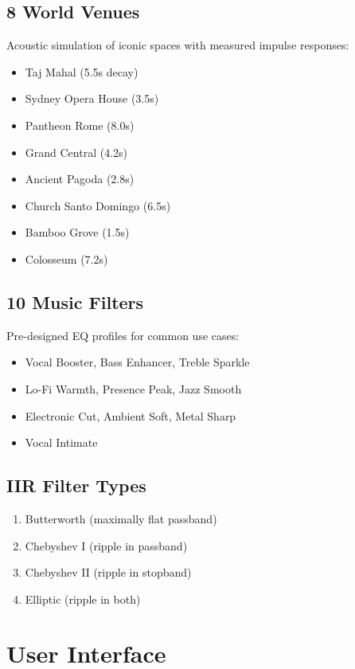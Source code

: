 \documentclass[twocolumn]{article}
\begin{document}
\subsection{8 World Venues}
Acoustic simulation of iconic spaces with measured impulse responses:
\begin{itemize}
    \item Taj Mahal (5.5s decay)
    \item Sydney Opera House (3.5s)
    \item Pantheon Rome (8.0s)
    \item Grand Central (4.2s)
    \item Ancient Pagoda (2.8s)
    \item Church Santo Domingo (6.5s)
    \item Bamboo Grove (1.5s)
    \item Colosseum (7.2s)
\end{itemize}

\subsection{10 Music Filters}
Pre-designed EQ profiles for common use cases:
\begin{itemize}
    \item Vocal Booster, Bass Enhancer, Treble Sparkle
    \item Lo-Fi Warmth, Presence Peak, Jazz Smooth
    \item Electronic Cut, Ambient Soft, Metal Sharp
    \item Vocal Intimate
\end{itemize}

\subsection{IIR Filter Types}
\begin{enumerate}
    \item Butterworth (maximally flat passband)
    \item Chebyshev I (ripple in passband)
    \item Chebyshev II (ripple in stopband)
    \item Elliptic (ripple in both)
\end{enumerate}

\section{User Interface}
\end{document}
